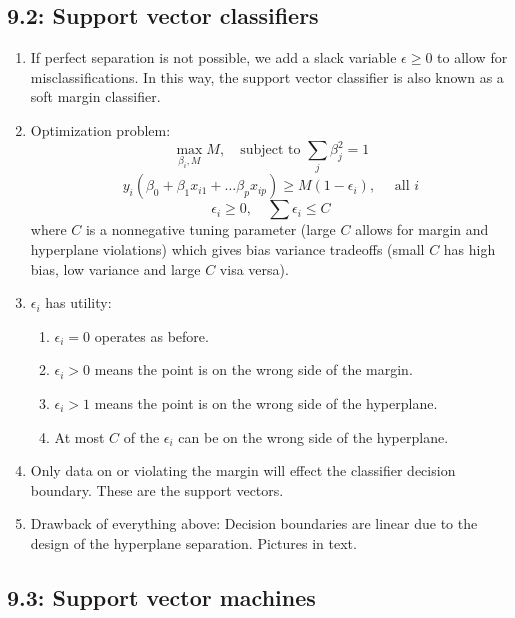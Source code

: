 \documentclass{article}
\begin{document}
\subsection*{9.2: Support vector classifiers}
\begin{enumerate}
\item If perfect separation is not possible, we add a slack variable $\epsilon \geq 0$ to allow for misclassifications. In this way, the support vector classifier is also known as a soft margin classifier.
\item Optimization problem:
\[
\max_{\beta_i, M} M, \quad \text{subject to } \sum_{j} \beta_j^2 = 1
\]
\[
y_i \left(\beta_0 + \beta_1 x_{i1} + \dots \beta_p x_{ip} \right) \geq M(1-\epsilon_i), \quad \text{ all $i$}
\]
\[
\epsilon_i \geq 0, \quad \sum \epsilon_i \leq C
\]
where $C$ is a nonnegative tuning parameter (large $C$ allows for margin and hyperplane violations) which gives bias variance tradeoffs (small $C$ has high bias, low variance and large $C$ visa versa).  
\item $\epsilon_i$ has utility:
\begin{enumerate}
\item $\epsilon_i = 0$ operates as before.
\item $\epsilon_i > 0$ means the point is on the wrong side of the margin.
\item $\epsilon_i > 1$ means the point is on the wrong side of the hyperplane. 
\item At most $C$ of the $\epsilon_i$ can be on the wrong side of the hyperplane.
\end{enumerate}
\item Only data on or violating the margin will effect the classifier decision boundary. These are the support vectors.
\item Drawback of everything above: Decision boundaries are linear due to the design of the hyperplane separation. Pictures in text.
\end{enumerate}


\subsection*{9.3: Support vector machines}
\end{document}
